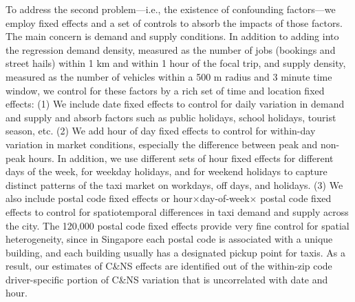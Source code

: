 \documentclass[reviewmode,AEJ]{AEA}
\begin{document}
To address the second problem---i.e., the existence of confounding factors---we employ fixed effects and a
set of controls to absorb the impacts of those factors. The main concern is demand and supply conditions.
In addition to adding  into the regression demand density, measured as the number of jobs (bookings and street 
hails) within 1 km and within 1 hour of the focal trip, and supply density, measured as the number of vehicles
within a 500 m radius and 3 minute time window, we control for these factors by a rich set of time and
location fixed effects: (1) We include date fixed effects to control for daily variation in demand and 
supply and absorb factors such as public holidays, school holidays, tourist season, etc. (2) We add hour 
of day fixed effects to control for within-day variation in market conditions, especially the difference 
between peak and non-peak hours. In addition, we use different sets of hour fixed effects for different days 
of the week, for weekday holidays, and for weekend holidays to capture distinct patterns of the taxi market on 
workdays, off days, and holidays. 
(3)  We also include postal code fixed effects or hour\(\times\)day-of-week\(\times\) postal code fixed effects to control 
for spatiotemporal differences in taxi demand and supply across the city.
The 120,000 postal code fixed effects provide very fine control for spatial 
heterogeneity, since in Singapore each postal code is associated with a unique building, and each building
usually has a designated pickup point for taxis. As a result, our estimates of C\&NS effects are identified 
out of the within-zip code driver-specific portion of C\&NS variation that is uncorrelated with date and hour. 
\end{document}
